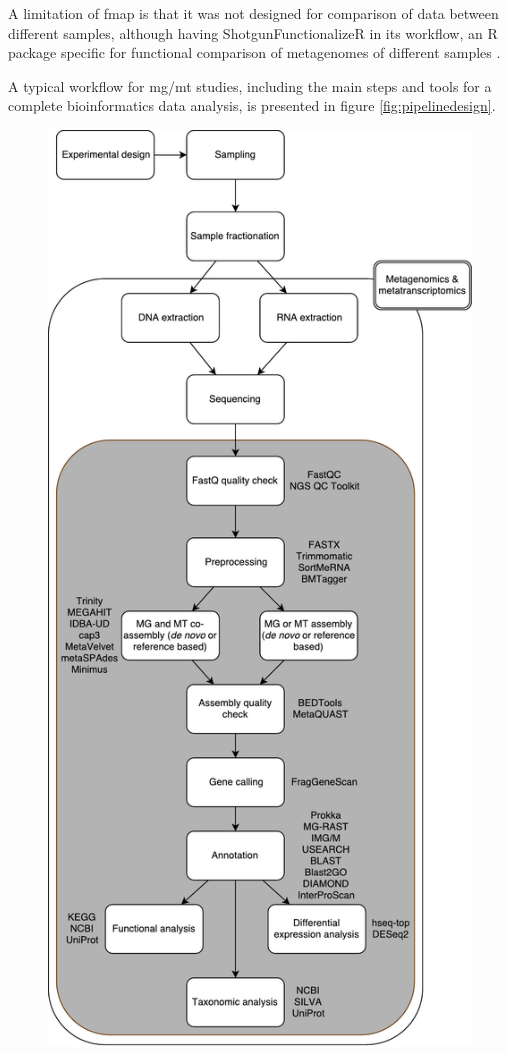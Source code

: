 \documentclass[
  oneside,
  11pt, a4paper,
  footinclude=true,
  headinclude=true,
  cleardoublepage=empty
]{scrbook}
\begin{document}
    A limitation of \gls{fmap} is that it was not designed for comparison of data between different samples, although having ShotgunFunctionalizeR in its workflow, an R package specific for functional comparison of metagenomes of different samples \citep{kristiansson2009shotgunfunctionalizer}.
    
    A typical workflow for \gls{mg}/\gls{mt} studies, including the main steps and tools for a complete bioinformatics data analysis, is presented in figure \ref{fig:pipelinedesign}.
    
    \begin{figure}[ph!]
    \includegraphics[width=\columnwidth, height=\textheight]{FiguresUndTables/Development/entire_pipeline.pdf}

\end{figure}
\end{document}
